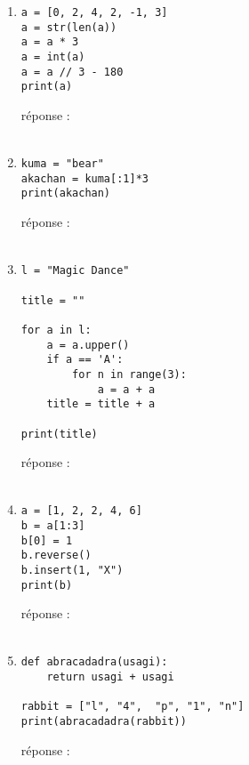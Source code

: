 \documentclass[12pt,a4paper]{article}
\newcommand{\response}{réponse : \hrulefill\\\\}
\begin{document}
\begin{enumerate}
\begin{lstlisting}
def is_p(a):
	if n // 2 == n / 2:
		return True
	return False

l = [1, 5, 8, 3, 10]
p = []
i = []

while len(l) > 0:
	n = l.pop(0)
	if is_p(n):
		p.append(n)
	else:
		i.append(n)
		
print(str(p) + " " + str(i))
\end{lstlisting}
\response %


\item
\begin{lstlisting}
a = [0, 2, 4, 2, -1, 3]
a = str(len(a))
a = a * 3
a = int(a)
a = a // 3 - 180
print(a) 
\end{lstlisting}
\response %

\item
\begin{lstlisting}
kuma = "bear"
akachan = kuma[:1]*3
print(akachan)

\end{lstlisting}
\response %

\pagebreak
\item
\begin{lstlisting}
l = "Magic Dance"

title = ""

for a in l:
	a = a.upper()
	if a == 'A':
		for n in range(3):
			a = a + a
	title = title + a
	
print(title)
\end{lstlisting}
\response %

\item
\begin{lstlisting}
a = [1, 2, 2, 4, 6]
b = a[1:3]
b[0] = 1
b.reverse()
b.insert(1, "X")
print(b) 
\end{lstlisting}
\response %

\item
\begin{lstlisting}
def abracadadra(usagi):
	return usagi + usagi

rabbit = ["l", "4",  "p", "1", "n"]
print(abracadadra(rabbit))
\end{lstlisting}
\response %

\end{enumerate}
\end{document}
